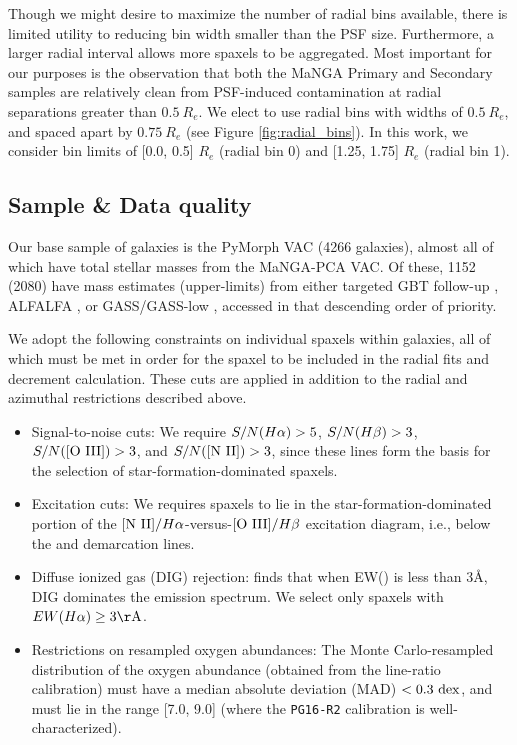 Though we might desire to maximize the number of radial bins available, there is limited utility to reducing bin width smaller than the PSF size. Furthermore, a larger radial interval allows more spaxels to be aggregated. Most important for our purposes is the observation that both the MaNGA Primary and Secondary samples are relatively clean from PSF-induced contamination at radial separations greater than $0.5~R_e$. We elect to use radial bins with widths of $0.5~R_e$, and spaced apart by $0.75~R_e$ (see Figure \ref{fig:radial_bins}). In this work, we consider bin limits of [0.0, 0.5] $R_e$ (radial bin 0) and [1.25, 1.75] $R_e$ (radial bin 1).

\subsection{Sample \& Data quality}
\label{subsubsec:data_quality}

Our base sample of galaxies is the PyMorph VAC (4266 galaxies), almost all of which have total stellar masses from the MaNGA-PCA VAC. Of these, 1152 (2080) have \hi mass estimates (upper-limits) from either targeted GBT follow-up \citep{masters_19_himanga, goddy_2020_gbtcal}, ALFALFA \citep{haynes_2018_alfalfa}, or GASS/GASS-low \citep{catinella_2010_GASS}, accessed in that descending order of priority. 

We adopt the following constraints on individual spaxels within galaxies, all of which must be met in order for the spaxel to be included in the radial fits and decrement calculation. These cuts are applied in addition to the radial and azimuthal restrictions described above.

\begin{itemize}
    \item Signal-to-noise cuts: We require $S/N(H\alpha) > 5$, $S/N(H\beta) > 3$, $S/N([{\rm O ~ III}]) > 3$, and $S/N([{\rm N ~ II}]) > 3$, since these lines form the basis for the selection of star-formation-dominated spaxels.
    \item Excitation cuts: We requires spaxels to lie in the star-formation-dominated portion of the $[{\rm N ~ II}] / H\alpha$-versus-$[{\rm O ~ III}] / H\beta$ excitation diagram, i.e., below the \citet{kauffmann_03_agn} and \citet{kewley_dopita_01} demarcation lines.
    \item Diffuse ionized gas (DIG) rejection: \citet{lacerda_2018_califa_dig} finds that when EW(\ha) is less than 3$\mbox{\AA}$, DIG dominates the emission spectrum. We select only spaxels with $EW(\ha) \ge 3 {\rm \AA}$.
    \item Restrictions on resampled oxygen abundances: The Monte Carlo-resampled distribution of the oxygen abundance (obtained from the line-ratio calibration) must have a median absolute deviation (MAD) $< 0.3 ~ {\rm dex}$, and must lie in the range [7.0, 9.0] (where the \texttt{PG16-R2} calibration is well-characterized).
\end{itemize}

